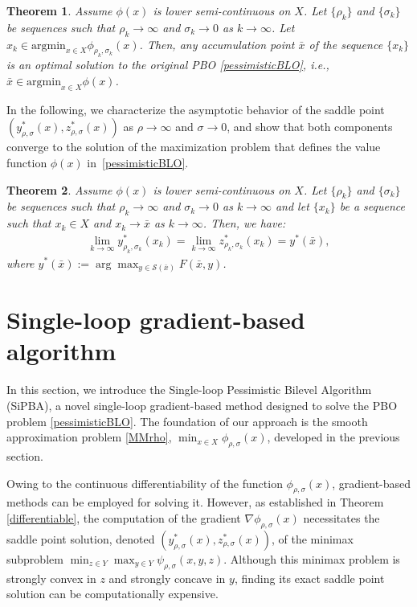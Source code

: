 \documentclass{article}
\newtheorem{theorem}{Theorem}[section]
\begin{document}
\begin{theorem}\label{convergethm}
 Assume $\phi(x)$ is lower semi-continuous on $X$. Let $\{\rho_k\}$ and $\{\sigma_k\}$ be sequences such that $\rho_k \rightarrow \infty$ and $\sigma_k \rightarrow 0$ as $k \rightarrow \infty$. Let $x_k \in \mathrm{argmin}_{x \in X} \phi_{\rho_k, \sigma_k}(x)$. Then, any accumulation point $\bar{x}$ of the sequence $\{x_k\}$ is an optimal solution to the original PBO \eqref{pessimisticBLO}, i.e., $\bar{x} \in \mathrm{argmin}_{x \in X} \phi(x)$.
\end{theorem}

In the following, we characterize the asymptotic behavior of the saddle point $(y_{\rho,\sigma}^*(x),z_{\rho,\sigma}^*(x))$ as $\rho\rightarrow \infty$ and $\sigma \rightarrow 0$, and show that both components converge to the solution of the maximization problem that defines the value function $\phi(x)$ in~\eqref{pessimisticBLO}.
\begin{theorem}\label{lim_yz}
      Assume $\phi(x)$ is lower semi-continuous on $X$. Let $\{\rho_k\}$ and $\{\sigma_k\}$ be sequences such that $\rho_k \rightarrow \infty$ and $\sigma_k \rightarrow 0$ as $k \rightarrow \infty$ and let $\{x_k\}$ be a sequence such that $x_k \in X$ and $x_k \rightarrow \bar{x}$ as $k \rightarrow \infty$. Then, we have:
    \begin{align}\label{lem_yz_eq}
        \lim_{k\to\infty}y_{\rho_{k}, \sigma_{k}}^*(x_k)=\lim_{{k}\to\infty}z_{\rho_{k}, \sigma_{k}}^*(x_{k})=y^*(\bar{x}),
    \end{align}
    where $y^*(\bar{x}):= \arg\max_{y \in \mathcal{S}(\bar{x})}F(\bar{x},y)$.
\end{theorem}


\section{Single-loop gradient-based algorithm}\label{section proposed algorithm}

In this section, we introduce the Single-loop Pessimistic Bilevel Algorithm (SiPBA), a novel single-loop gradient-based method designed to solve the PBO problem \eqref{pessimisticBLO}.
The foundation of our approach is the smooth approximation problem \eqref{MMrho}, $\min_{x\in {X}}\phi_{\rho,\sigma}(x)$, developed in the previous section.

Owing to the continuous differentiability of the function $\phi_{\rho,\sigma}(x)$, gradient-based methods can be employed for solving it. However, as established in Theorem \ref{differentiable}, the computation of the gradient $\nabla \phi_{\rho,\sigma}(x)$ necessitates the saddle point solution, denoted $(y_{\rho,\sigma}^*(x),z_{\rho,\sigma}^*(x))$, of the minimax subproblem $\min_{z\in {Y}} \max_{ y \in {Y}}\psi_{\rho,\sigma}(x, y, z)$. 
Although this minimax problem is strongly convex in $z$ and strongly concave in $y$, finding its exact saddle point solution can be computationally expensive.
\end{document}
